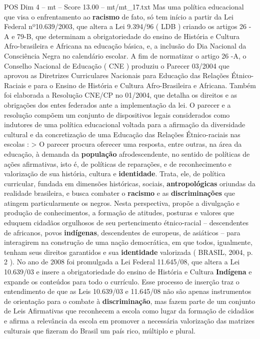 \begin{textsample}{POS Dim 4 – mt – Score 13.00 – mt/mt\_17.txt}
Mas uma política educacional que visa o enfrentamento ao \textbf{racismo} de fato, só tem início a partir da Lei Federal nº10.639/2003, que altera a Lei 9.394/96 ( LDB ) criando os artigos 26 -A e 79-B, que determinam a obrigatoriedade do ensino de História e Cultura Afro-brasileira e Africana na educação básica, e, a inclusão do Dia Nacional da Consciência Negra no calendário escolar.
A fim de normatizar o artigo 26 -A, o Conselho Nacional de Educação ( CNE ) produziu o Parecer 03/2004 que aprovou as Diretrizes Curriculares Nacionais para Educação das Relações Étnico-Raciais e para o Ensino de História e Cultura Afro-Brasileira e Africana.
Também foi elaborada a Resolução CNE/CP no 01/2004, que detalha os direitos e as obrigações dos entes federados ante a implementação da lei.
O parecer e a resolução compõem um conjunto de dispositivos legais considerados como indutores de uma política educacional voltada para a afirmação da diversidade cultural e da concretização de uma Educação das Relações Étnico-raciais nas escolas : > O parecer procura oferecer uma resposta, entre outras, na área da educação, à demanda da \textbf{população} afrodescendente, no sentido de políticas de ações afirmativas, isto é, de políticas de reparações, e de reconhecimento e valorização de sua história, cultura e \textbf{identidade}.
Trata, ele, de política curricular, fundada em dimensões históricas, sociais, \textbf{antropológicas} oriundas da realidade brasileira, e busca combater o \textbf{racismo} e as \textbf{discriminações} que atingem particularmente os negros.
Nesta perspectiva, propõe a divulgação e produção de conhecimentos, a formação de atitudes, posturas e valores que eduquem cidadãos orgulhosos de seu pertencimento étnico-racial – descendentes de africanos, povos \textbf{indígenas}, descendentes de europeus, de asiáticos – para interagirem na construção de uma nação democrática, em que todos, igualmente, tenham seus direitos garantidos e sua \textbf{identidade} valorizada ( BRASIL, 2004, p. 2 ).
No ano de 2008 foi promulgada a Lei Federal 11.645/08, que altera a Lei 10.639/03 e insere a obrigatoriedade do ensino de História e Cultura \textbf{Indígena} e expande os conteúdos para todo o currículo.
Esse processo de inserção traz o entendimento de que as Leis 10.639/03 e 11.645/08 não são apenas instrumentos de orientação para o combate à \textbf{discriminação}, mas fazem parte de um conjunto de Leis Afirmativas que reconhecem a escola como lugar da formação de cidadãos e afirma a relevância da escola em promover a necessária valorização das matrizes culturais que fizeram do Brasil um país rico, múltiplo e plural.

\end{textsample}
